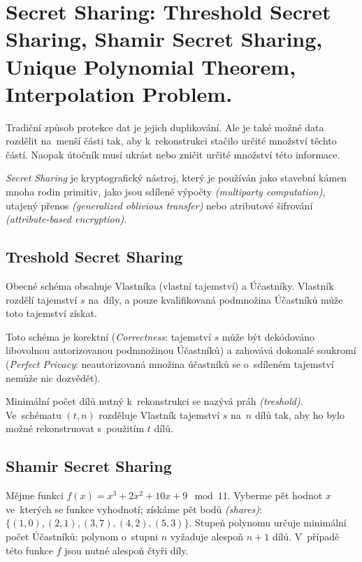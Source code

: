 \clearpage
\section{Secret Sharing: Threshold Secret Sharing, Shamir Secret Sharing, Unique Polynomial Theorem, Interpolation Problem.}

Tradiční způsob protekce dat je jejich duplikování.
Ale je také možné data rozdělit na~menší části tak, aby k~rekonstrukci stačilo určité množství těchto částí.
Naopak útočník musí ukrást nebo zničit určité množství této informace.

\emph{Secret Sharing} je kryptografický nástroj, který je používán jako stavební kámen mnoha rodin primitiv, jako jsou sdílené výpočty \emph{(multiparty computation)}, utajený přenos \emph{(generalized oblivious transfer)} nebo atributové šifrování \emph{(attribute-based encryption)}.


\subsection{Treshold Secret Sharing}

Obecné schéma obsahuje Vlastníka (vlastní tajemství) a Účastníky.
Vlastník rozdělí tajemství $s$ na~díly, a pouze kvalifikovaná podmnožina Účastníků může toto tajemství získat.

Toto schéma je korektní (\emph{Correctness}: tajemství $s$ může být dekódováno libovolnou autorizovanou podmnožinou Účastníků) a zahovává dokonalé soukromí (\emph{Perfect Privacy}: neautorizovaná množina účastníků se o~sdíleném tajemství nemůže nic dozvědět).

Minimální počet dílů nutný k~rekonstrukci se nazývá práh \emph{(treshold)}.
Ve~schématu $(t,n)$ rozděluje Vlastník tajemství $s$ na~$n$ dílů tak, aby ho bylo možné rekonstruovat s~použitím $t$ dílů.


\subsection{Shamir Secret Sharing}
\label{sec:sharmir-secret-sharing}

Mějme funkci $f(x) = x^3 + 2x^2 + 10x + 9 \mod 11$.
Vyberme pět hodnot $x$ ve~kterých se funkce vyhodnotí; získáme pět bodů \emph{(shares)}: $\{(1,0),(2,1),(3,7),(4,2),(5,3)\}$.
Stupeň polynomu určuje minimální počet Účastníků: polynom o~stupni $n$ vyžaduje alespoň $n+1$ dílů.
V~případě této funkce $f$ jsou nutné alespoň čtyři díly.

